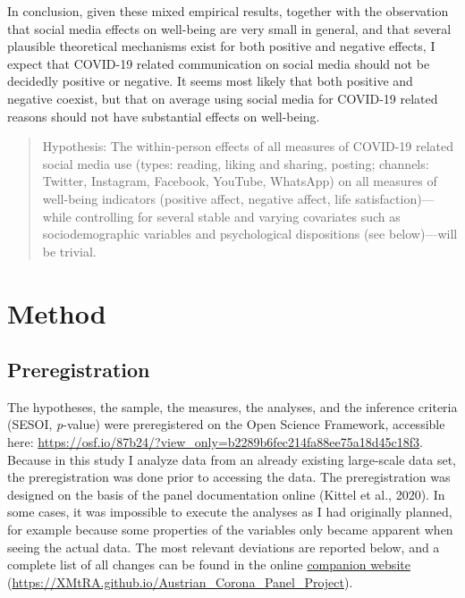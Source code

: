 \documentclass[
  man,mask,floatsintext]{apa7}
\begin{document}
In conclusion, given these mixed empirical results, together with the observation that social media effects on well-being are very small in general, and that several plausible theoretical mechanisms exist for both positive and negative effects, I expect that COVID-19 related communication on social media should not be decidedly positive or negative.
It seems most likely that both positive and negative coexist, but that on average using social media for COVID-19 related reasons should not have substantial effects on well-being.

\begin{quote}
Hypothesis: The within-person effects of all measures of COVID-19 related social media use (types: reading, liking and sharing, posting; channels: Twitter, Instagram, Facebook, YouTube, WhatsApp) on all measures of well-being indicators (positive affect, negative affect, life satisfaction)---while controlling for several stable and varying covariates such as sociodemographic variables and psychological dispositions (see below)---will be trivial.
\end{quote}

\hypertarget{method}{%
\section{Method}\label{method}}

\hypertarget{preregistration}{%
\subsection{Preregistration}\label{preregistration}}

The hypotheses, the sample, the measures, the analyses, and the inference criteria (SESOI, \emph{p}-value) were preregistered on the Open Science Framework, accessible here: \url{https://osf.io/87b24/?view_only=b2289b6fec214fa88ee75a18d45c18f3}.
Because in this study I analyze data from an already existing large-scale data set, the preregistration was done prior to accessing the data.
The preregistration was designed on the basis of the panel documentation online (Kittel et al., 2020).
In some cases, it was impossible to execute the analyses as I had originally planned, for example because some properties of the variables only became apparent when seeing the actual data.
The most relevant deviations are reported below, and a complete list of all changes can be found in the online \href{https://XMtRA.github.io/Austrian_Corona_Panel_Project}{companion website} (\url{https://XMtRA.github.io/Austrian_Corona_Panel_Project}).
\end{document}
